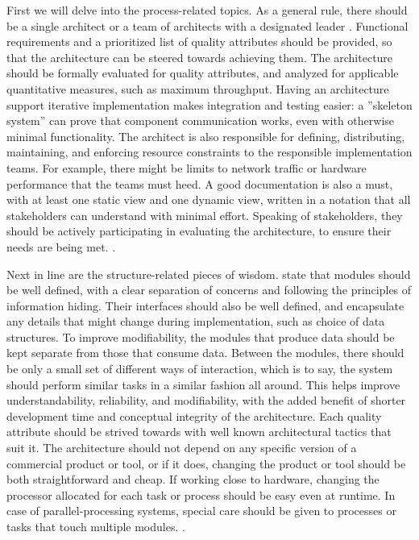 \documentclass[utf8,english]{gradu3}
\begin{document}
First we will delve into the process-related topics. As a general rule,
there should be a single architect or a team of architects with a designated
leader \parencite[15]{Bass1998}. Functional requirements and a prioritized list
of quality attributes should be provided, so that the architecture can be steered
towards achieving them. The architecture should be formally evaluated for
quality attributes, and analyzed for applicable quantitative measures, such as
maximum throughput. Having an architecture support iterative implementation
makes integration and testing easier: a ''skeleton system'' can prove that
component communication works, even with otherwise minimal functionality. The
architect is also responsible for defining, distributing, maintaining, and
enforcing resource constraints to the responsible implementation teams. For
example, there might be limits to network traffic or hardware performance that
the teams must heed. A good documentation is also a must, with at least one
static view and one dynamic view, written in a notation that all stakeholders
can understand with minimal effort. Speaking of stakeholders, they should be
actively participating in evaluating the architecture, to ensure their needs are
being met. \parencite[15]{Bass1998}.

Next in line are the structure-related pieces of wisdom.
\textcite[16]{Bass1998} state that modules should be well defined, with a clear
separation of concerns and following the principles of information hiding. Their
interfaces should also be well defined, and encapsulate any details that might
change during implementation, such as choice of data structures. To improve
modifiability, the modules that produce data should be kept separate from those
that consume data. Between the modules, there should be only a small set of
different ways of interaction, which is to say, the system should perform
similar tasks in a similar fashion all around. This helps improve
understandability, reliability, and modifiability, with the added benefit of
shorter development time and conceptual integrity of the architecture. Each
quality attribute should be strived towards with well known architectural
tactics that suit it. The architecture should not depend on any specific version
of a commercial product or tool, or if it does, changing the product or tool
should be both straightforward and cheap. If working close to hardware, changing
the processor allocated for each task or process should be easy even at runtime.
In case of parallel-processing systems, special care should be given to
processes or tasks that touch multiple modules. \parencite[16]{Bass1998}.
\end{document}
